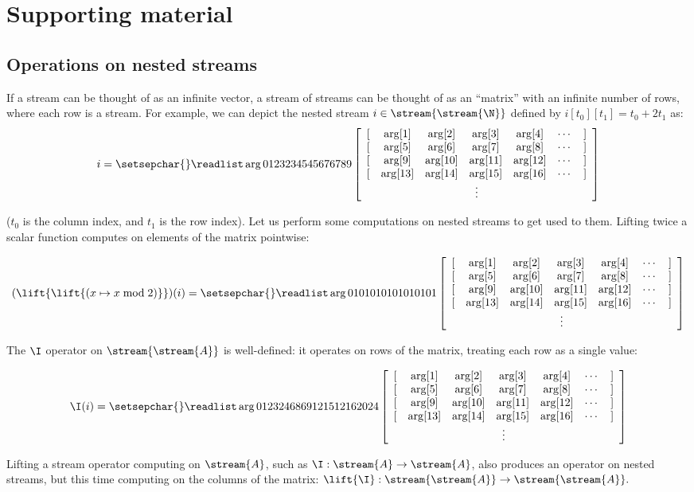 \section{Supporting material}\label{sec:extra}





\subsection{Operations on nested streams}\label{sec:nested-examples}

\newcommand{\ssa}[1]{
\setsepchar{ }
\readlist\arg{#1}
\begin{bmatrix}
   \begin{array}{ccccccc}
        {[} & \arg[1] & \arg[2] & \arg[3] & \arg[4] & \cdots & {]} \\
        {[} & \arg[5] & \arg[6] & \arg[7] & \arg[8] & \cdots & {]} \\
        {[} & \arg[9] & \arg[10] & \arg[11] & \arg[12] & \cdots & {]} \\
        {[} & \arg[13] & \arg[14] & \arg[15] & \arg[16] & \cdots & {]} \\
        \multicolumn{7}{c}{\vdots}
   \end{array}
\end{bmatrix}
}

If a stream can be thought of as an infinite vector, a stream of streams can be thought of
as an ``matrix'' with an infinite number of rows, where each row is a stream.  
For example, we can depict the nested stream 
$i \in \stream{\stream{\N}}$ defined by $i[t_0][t_1] = t_0 + 2 t_1$ as:
$$ i = \ssa{0 1 2 3 2 3 4 5 4 5 6 7 6 7 8 9} $$

\noindent ($t_0$ is the column index, and $t_1$ is the row index).  Let us
perform some computations on nested streams to get used to them.  Lifting twice
a scalar function computes on elements of the matrix pointwise:

$$(\lift{\lift{(x \mapsto x \bmod 2)}})(i) = 
  \ssa{0 1 0 1 0 1 0 1 0 1 0 1 0 1 0 1}
$$

The $\I$ operator on $\stream{\stream{A}}$ is well-defined: it operates on rows
of the matrix, treating each row as a single value:

$$\I(i) = \ssa{0 1 2 3 2 4 6 8 6 9 12 15 12 16 20 24}$$

Lifting a stream operator computing on $\stream{A}$, 
such as $\I: \stream{A} \to \stream{A}$, also produces an operator on nested streams, but
this time computing on the columns of the matrix:
$\lift{\I}: \stream{\stream{A}} \to \stream{\stream{A}}.$

